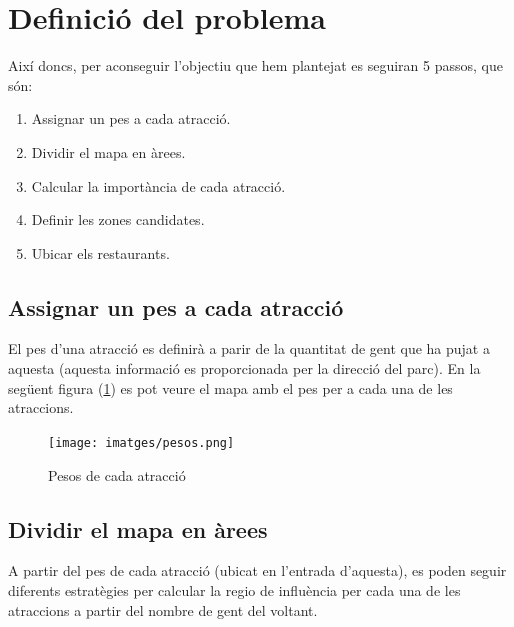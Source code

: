 \documentclass[12pt]{article}
\begin{document}
\clearpage
\section{Definició del problema}
Així doncs, per aconseguir l'objectiu que hem plantejat es seguiran 5 passos, que són:
\begin{enumerate}
	\item Assignar un pes a cada atracció.
	\item Dividir el mapa en àrees.
	\item Calcular la importància de cada atracció.
	\item Definir les zones candidates.
	\item Ubicar els restaurants.
\end{enumerate}

\subsection{Assignar un pes a cada atracció}
El pes d'una atracció es definirà a parir de la quantitat de gent que ha pujat a aquesta (aquesta informació es proporcionada per la direcció del parc). En la següent figura (\ref{fig:mapa_areas}) es pot veure el mapa amb el pes per a cada una de les atraccions.

\begin{figure}[H]
	\centering
	\texttt{[image: imatges/pesos.png]}\par\vspace{1cm}
	\caption{Pesos de cada atracció}
	\label{fig:mapa_areas}
\end{figure}

\subsection{Dividir el mapa en àrees \label{arees}}
A partir del pes de cada atracció (ubicat en l'entrada d'aquesta), es poden seguir diferents estratègies per calcular la regio de influència per cada una de les atraccions a partir del nombre de gent del voltant.
\end{document}
